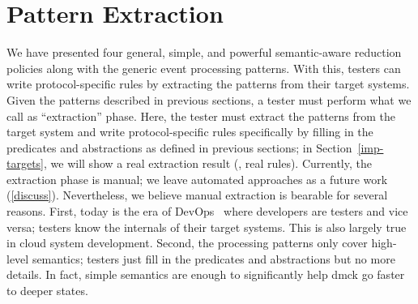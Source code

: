 \section{Pattern Extraction}
\label{sam-extract}


We have presented four general, simple, and powerful semantic-aware
reduction policies along with the generic event processing patterns.
With this, testers can write protocol-specific rules by extracting the
patterns from their target systems.  
%
Given the patterns described in previous sections, a tester must
perform what we call as ``extraction'' phase.  Here, the tester must
extract the patterns from the target system and write
protocol-specific rules specifically by filling in the predicates and
abstractions as defined in previous sections; in
Section~\ref{imp-targets}, we will show a real extraction result (\ie,
real rules).  Currently, the extraction phase is manual; we leave
automated approaches as a future work (\sec\ref{discuss}).
Nevertheless, we believe manual extraction is bearable for several
reasons.  First, today is the era of
DevOps~\cite{Limoncelli+11-Devops} where developers are testers and
vice versa; testers know the internals of their target systems.  This
is also largely true in cloud system development.  Second, the
processing patterns only cover high-level semantics; testers just fill
in the predicates and abstractions but no more details.  In fact,
simple semantics are enough to significantly help dmck go faster to
deeper states.




